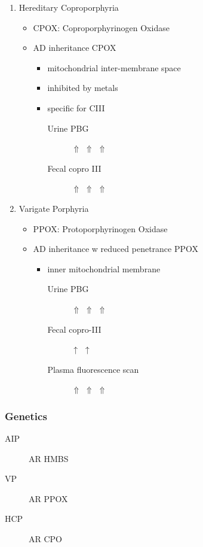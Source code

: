 \documentclass[12pt]{scrartcl}
\begin{document}
\begin{enumerate}
\item Hereditary Coproporphyria
\label{sec:org9fc6eef}
\begin{itemize}
\item CPOX: Coproporphyrinogen Oxidase
\item AD inheritance CPOX
\begin{itemize}
\item mitochondrial inter-membrane space
\item inhibited by metals
\item specific for CIII
\begin{description}
\item[{Urine PBG}] \(\Uparrow\) \(\Uparrow\) \(\Uparrow\)
\item[{Fecal copro III}] \(\Uparrow\) \(\Uparrow\) \(\Uparrow\)
\end{description}
\end{itemize}
\end{itemize}

\item Varigate Porphyria
\label{sec:org4bff4b0}
\begin{itemize}
\item PPOX: Protoporphyrinogen Oxidase
\item AD inheritance w reduced penetrance PPOX

\begin{itemize}
\item inner mitochondrial membrane
\begin{description}
\item[{Urine PBG}] \(\Uparrow\) \(\Uparrow\) \(\Uparrow\)
\item[{Fecal copro-III}] \(\uparrow\) \(\uparrow\)
\item[{Plasma fluorescence scan}] \(\Uparrow\) \(\Uparrow\) \(\Uparrow\)
\end{description}
\end{itemize}
\end{itemize}
\end{enumerate}

\subsubsection{Genetics}
\label{sec:org9537844}
\begin{description}
\item[{AIP}] AR HMBS
\item[{VP}] AR PPOX
\item[{HCP}] AR CPO
\end{description}
\end{document}
